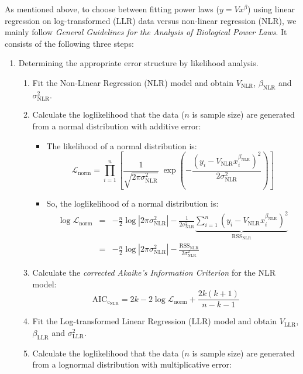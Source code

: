 \documentclass[12pt,oneside,letterpaper]{article}
\begin{document}
As mentioned above, to choose between fitting power laws ($y=Vx^\beta$) using linear regression on log-transformed (LLR) data versus non-linear regression (NLR), we mainly follow \emph{General Guidelines for the Analysis of Biological Power Laws}\cite{ecology}. It consists of the following three steps:
\begin{enumerate}
    \item Determining the appropriate error structure by likelihood analysis.
    \begin{enumerate}
        \item Fit the Non-Linear Regression (NLR) model and obtain $V_\text{NLR}$, $\beta_\text{NLR}$ and $\sigma_\text{NLR}^2$.
        \item Calculate the loglikelihood that the data ($n$ is sample size) are generated from a normal distribution with additive error:
        \begin{itemize}
            \item The likelihood of a normal distribution is:  
            $$\mathcal{L}_\text{norm} = \prod_{i=1}^n\left[\frac{1}{\sqrt{2\pi\sigma^2_\text{NLR}}}\;\exp{\left(-\frac{\left(y_i-V_\text{NLR}x_i^{\beta_\text{NLR}}\right)^2}{2\sigma^2_\text{NLR}}\right)}\right]$$
            \item So, the loglikelihood of a normal distribution is:
            \begin{eqnarray*}
                \log\mathcal{L}_\text{norm} &=& -\frac{n}{2}\log\left|2\pi\sigma^2_\text{NLR}\right| - \frac{1}{2\sigma^2_\text{NLR}}\underbrace{\sum_{i=1}^n\left(y_i-V_\text{NLR}x_i^{\beta_\text{NLR}}\right)^2}_{\mathrm{RSS
                }_\text{NLR}}\\
                &=& -\frac{n}{2}\log\left|2\pi\sigma^2_\text{NLR}\right|-\frac{\mathrm{RSS}_\text{NLR}}{2\sigma^2_\text{NLR}}
            \end{eqnarray*}
        \end{itemize}
        \item Calculate the \emph{corrected Akaike's Information Criterion} for the NLR model:
        $$\mathrm{AIC_{c_{NLR}}} = 2k - 2\log\mathcal{L}_\text{norm} + \frac{2k(k+1)}{n-k-1}$$
        \item Fit the Log-transformed Linear Regression (LLR) model and obtain $V_\text{LLR}$, $\beta_\text{LLR}$ and $\sigma_\text{LLR}^2$.
        \item Calculate the loglikelihood that the data ($n$ is sample size) are generated from a lognormal distribution with multiplicative error:

\end{enumerate}
\end{enumerate}
\end{document}
